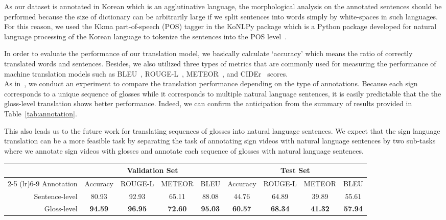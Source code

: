 \documentclass[10pt,twocolumn,letterpaper]{article}
\begin{document}
As our dataset is annotated in Korean which is an agglutinative language, the morphological analysis on the annotated sentences should be performed because the size of dictionary can be arbitrarily large if we split sentences into words simply by white-spaces in such languages. For this reason, we used the Kkma part-of-speech (POS) tagger in the KoNLPy package which is a Python package developed for natural language processing of the Korean language to tokenize the sentences into the POS level~\cite{ParkC14}.

In order to evaluate the performance of our translation model, we basically calculate `accuracy' which means the ratio of correctly translated words and sentences. Besides, we also utilized three types of metrics that are commonly used for measuring the performance of machine translation models such as BLEU~\cite{PapineniRWZ02}, ROUGE-L~\cite{Lin08}, METEOR~\cite{BanerjeeL05}, and CIDEr~\cite{VedantamZP15} scores.
\\

 As in~\cite{CamgozHKNB18}, we conduct an experiment to compare the translation performance depending on the type of annotations. Because each sign corresponds to a unique sequence of glosses while it corresponds to multiple natural language sentences, it is easily predictable that the the gloss-level translation shows better performance. Indeed, we can confirm the anticipation from the summary of results provided in Table~\ref{tab:annotation}. 

This also leads us to the future work for translating sequences of glosses into natural language sentences. We expect that the sign language translation can be a more feasible task by separating the task of annotating sign videos with natural language sentences by two sub-tasks where we annotate sign videos with glosses and annotate each sequence of glosses with natural language sentences.\\

\begin{table*}[htb]
\centering
\begin{tabular}{@{ } rcccccccc @{ }}
\toprule
& \multicolumn{4}{c}{Validation Set} & \multicolumn{4}{c}{Test Set} \\
\cmidrule(lr){2-5} \cmidrule(lr){6-9}
Annotation   &  Accuracy & ROUGE-L & METEOR  & BLEU  & Accuracy & ROUGE-L & METEOR  & BLEU \\
\midrule
Sentence-level & 80.93 & 92.93 & 65.11 & 88.08 & 44.76 & 64.89 & 39.89 & 55.61 \\
Gloss-level  & \textbf{94.59} & \textbf{96.95} & \textbf{72.60} & \textbf{95.03} &\textbf{60.57} & \textbf{68.34} & \textbf{41.32} & \textbf{57.94} \\
\bottomrule
\end{tabular}
\caption{Comparison of sign language translation performance on different types of annotations.}
\label{tab:annotation}
\end{table*}
\end{document}
